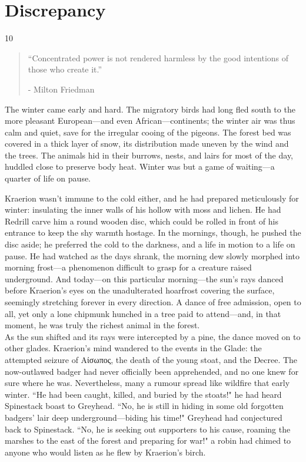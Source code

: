 \chapter{Discrepancy}

\vspace{-1.3cm}
\begin{localsize}{10}
    \begin{quote}
        “Concentrated power is not rendered harmless by the good intentions of those who create it.”
        \begin{flushright}- Milton Friedman \end{flushright}
    \end{quote}
\end{localsize}
\vspace{1cm}


The winter came early and hard.
The migratory birds had long fled south to the more pleasant European---and even African---continents; the winter air was thus calm and quiet, save for the irregular cooing of the pigeons.
The forest bed was covered in a thick layer of snow, its distribution made uneven by the wind and the trees.
The animals hid in their burrows, nests, and lairs for most of the day, huddled close to preserve body heat.
Winter was but a game of waiting---a quarter of life on pause.

Kraerion wasn't immune to the cold either, and he had prepared meticulously for winter: insulating the inner walls of his hollow with moss and lichen.
He had Redrill carve him a round wooden disc, which could be rolled in front of his entrance to keep the shy warmth hostage.
In the mornings, though, he pushed the disc aside; he preferred the cold to the darkness, and a life in motion to a life on pause.
He had watched as the days shrank, the morning dew slowly morphed into morning frost---a phenomenon difficult to grasp for a creature raised underground.
And today---on this particular morning---the sun's rays danced before Kraerion's eyes on the unadulterated hoarfrost covering the surface, seemingly stretching forever in every direction.
A dance of free admission, open to all, yet only a lone chipmunk hunched in a tree paid to attend---and, in that moment, he was truly the richest animal in the forest.\\

As the sun shifted and its rays were intercepted by a pine, the dance moved on to other glades.
Kraerion's mind wandered to the events in the Glade: the attempted seizure of Αίσωπος, the death of the young stoat, and the Decree.
The now-outlawed badger had never officially been apprehended, and no one knew for sure where he was.
Nevertheless, many a rumour spread like wildfire that early winter.
``He had been caught, killed, and buried by the stoats!" he had heard Spinestack boast to Greyhead.
``No, he is still in hiding in some old forgotten badgers' lair deep underground---biding his time!" Greyhead had conjectured back to Spinestack.
``No, he is seeking out supporters to his cause, roaming the marshes to the east of the forest and preparing for war!" a robin had chimed to anyone who would listen as he flew by Kraerion's birch.

